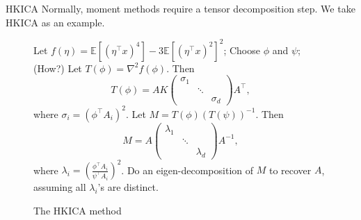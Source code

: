 \documentclass[final]{beamer} %
\newcommand{\EEp}[1]{\mathbb{E}\left[#1\right]}
\begin{document}
\begin{frame}[c]
\begin{columns}[t,totalwidth=\textwidth]
	\begin{column}{.24\textwidth}%
		\begin{block}{HKICA}
		Normally, moment methods require a tensor decomposition step. We take HKICA as an example.
		\vspace{1cm}
		\begin{figure}
		\centering
		\caption*{The HKICA method}
		\begin{algorithmic}[1]
		\STATE Let $f(\eta) = \EEp{(\eta^{\top}x)^4} - 3 \EEp{(\eta^{\top}x)^2}^2$;
		\STATE  Choose $\phi$ and $\psi$; (How?)
		\STATE Let $T(\phi) = \nabla^2 f(\phi)$. Then 
		\[T(\phi) = AK 
		\left(
		\begin{array}{ccc}
		\sigma_1 & & \\ %
		    & \ddots & \\
		    & & \sigma_d %
		\end{array} 
		\right) 
		A^{\top},
		\]
		where $\sigma_i = \left(\phi^{\top}A_i\right)^2$.
		\STATE Let $M = T(\phi)(T(\psi))^{-1}$. Then 
		\[M = A 
		\left(
		\begin{array}{ccc}
		\lambda_1 & & \\ %
		    & \ddots & \\
		    & & \lambda_d %
		\end{array} 
		\right) 
		A^{-1},
		\]
		where $\lambda_i = \left(\frac{\phi^{\top}A_i}{\psi^{\top}A_i}\right)^2$.
		\STATE Do an eigen-decomposition of $M$ to recover $A$, assuming all $\lambda_i$'s are distinct.
		\end{algorithmic}
		\end{figure}
		\end{block}
		\vspace{1.0ex}
				

\end{column}
\end{columns}
\end{frame}
\end{document}
